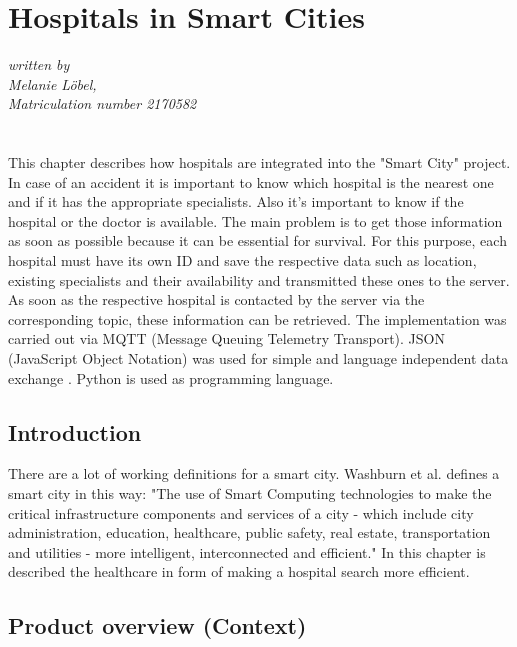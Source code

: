 \chapter{Hospitals in Smart Cities}
\label{abstract} 
\textsl{written by \\ Melanie Löbel, \\ Matriculation number 2170582
} \\ \\


\abstract
\\This chapter describes how hospitals are integrated into the "Smart City" project.
In case of an accident it is important to know which hospital is the nearest one and if it has the appropriate specialists. Also it’s important to know if the hospital or the doctor is available.
The main problem is to get those information as soon as possible because it can be essential for survival. For this purpose, each hospital must have its own ID and save the respective data such as location, existing specialists and their availability and transmitted these ones to the server. As soon as the respective hospital is contacted by the server via the corresponding topic, these information can be retrieved.
The implementation was carried out via MQTT (Message Queuing Telemetry Transport). JSON (JavaScript Object Notation) was used for simple and language independent data exchange \cite{sporny2019json}. Python is used as programming language.


\section{Introduction}
\label{sec:1}
There are a lot of working definitions for a smart city. Washburn et al. \cite{nam2011conceptualizing} defines a smart city in this way: "The use of Smart Computing technologies to make the critical infrastructure components and services of a city - which include city administration, education, healthcare, public safety, real estate, transportation and utilities - more intelligent, interconnected and efficient." In this chapter is described the healthcare in form of making a hospital search more efficient.

\section{Product overview (Context)}
\label{Hospital_Product overview}

